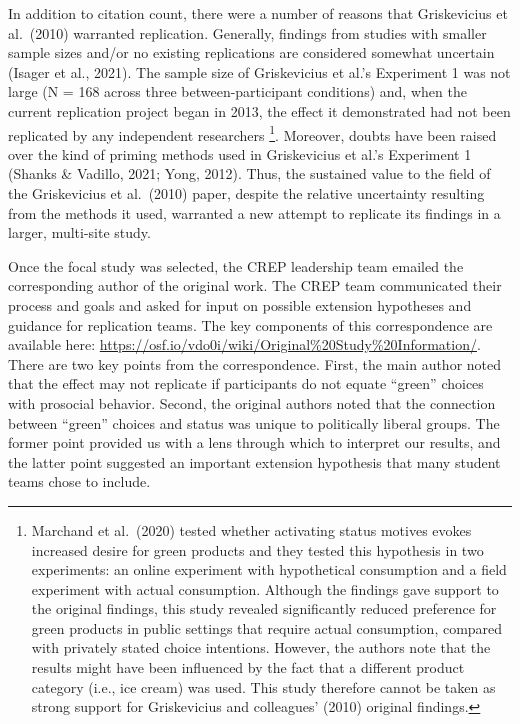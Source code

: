 \documentclass[
]{article}
\begin{document}
In addition to citation count, there were a number of reasons that
Griskevicius et al.~(2010) warranted replication. Generally, findings
from studies with smaller sample sizes and/or no existing replications
are considered somewhat uncertain (Isager et al., 2021). The sample size
of Griskevicius et al.'s Experiment 1 was not large (N = 168 across
three between-participant conditions) and, when the current replication
project began in 2013, the effect it demonstrated had not been
replicated by any independent researchers \footnote{Marchand et
  al.~(2020) tested whether activating status motives evokes increased
  desire for green products and they tested this hypothesis in two
  experiments: an online experiment with hypothetical consumption and a
  field experiment with actual consumption. Although the findings gave
  support to the original findings, this study revealed significantly
  reduced preference for green products in public settings that require
  actual consumption, compared with privately stated choice intentions.
  However, the authors note that the results might have been influenced
  by the fact that a different product category (i.e., ice cream) was
  used. This study therefore cannot be taken as strong support for
  Griskevicius and colleagues' (2010) original findings.}. Moreover,
doubts have been raised over the kind of priming methods used in
Griskevicius et al.'s Experiment 1 (Shanks \& Vadillo, 2021; Yong,
2012). Thus, the sustained value to the field of the Griskevicius et
al.~(2010) paper, despite the relative uncertainty resulting from the
methods it used, warranted a new attempt to replicate its findings in a
larger, multi-site study.

Once the focal study was selected, the CREP leadership team emailed the
corresponding author of the original work. The CREP team communicated
their process and goals and asked for input on possible extension
hypotheses and guidance for replication teams. The key components of
this correspondence are available here:
\url{https://osf.io/vdo0i/wiki/Original\%20Study\%20Information/}. There
are two key points from the correspondence. First, the main author noted
that the effect may not replicate if participants do not equate
``green'' choices with prosocial behavior. Second, the original authors
noted that the connection between ``green'' choices and status was
unique to politically liberal groups. The former point provided us with
a lens through which to interpret our results, and the latter point
suggested an important extension hypothesis that many student teams
chose to include.
\end{document}
